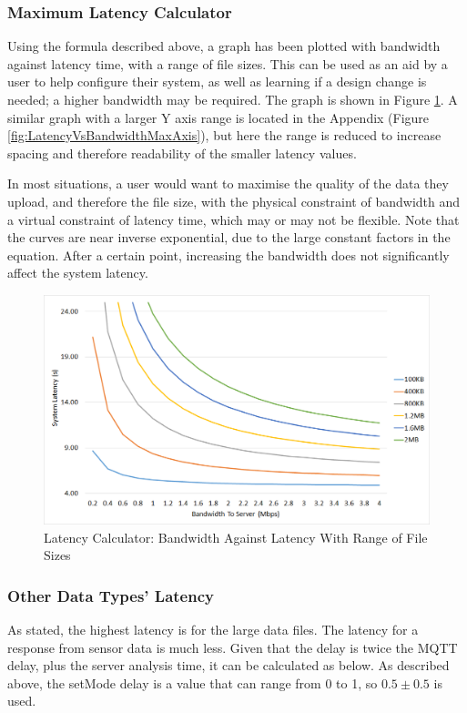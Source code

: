\documentclass{article}
\begin{document}
\subsubsection{Maximum Latency Calculator}
Using the formula described above, a graph has been plotted with bandwidth against latency time, with a range of file sizes. This can be used as an aid by a user to help configure their system, as well as learning if a design change is needed; a higher bandwidth may be required. The graph is shown in Figure \ref{fig:LatencyVsBandwidth}. A similar graph with a larger Y axis range is located in the Appendix (Figure \ref{fig:LatencyVsBandwidthMaxAxis}), but here the range is reduced to increase spacing and therefore readability of the smaller latency values. 

In most situations, a user would want to maximise the quality of the data they upload, and therefore the file size, with the physical constraint of bandwidth and a virtual constraint of latency time, which may or may not be flexible. Note that the curves are near inverse exponential, due to the large constant factors in the equation. After a certain point, increasing the bandwidth does not significantly affect the system latency.

\begin{figure}[h]
\caption{Latency Calculator: Bandwidth Against Latency With Range of File Sizes\label{fig:LatencyVsBandwidth}}
\includegraphics[width=\textwidth]{LatencyVsBandwidth}
\end{figure}

\subsubsection{Other Data Types' Latency}
As stated, the highest latency is for the large data files. The latency for a response from sensor data is much less. Given that the delay is twice the MQTT delay, plus the server analysis time, it can be calculated as below. As described above, the setMode delay is a value that can range from 0 to 1, so $0.5\pm0.5$ is used.
\end{document}

